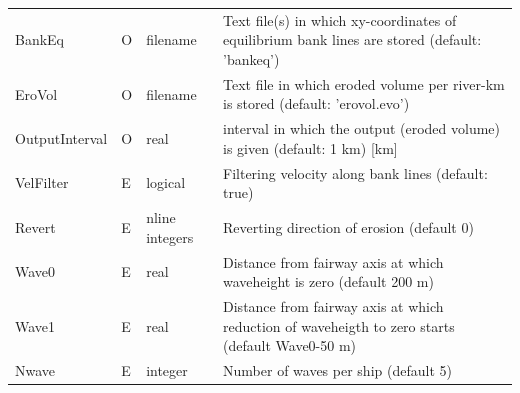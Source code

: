 \begin{tabular}{lllp{5cm}}
BankEq & O & filename & Text file(s) in which xy-coordinates of equilibrium bank lines are stored (default: 'bankeq') \\
EroVol & O & filename & Text file in which eroded volume per river-km is stored (default: 'erovol.evo') \\
OutputInterval & O & real & interval in which the output (eroded volume) is given (default: 1 km) [km] \\
VelFilter & E & logical & Filtering velocity along bank lines (default: true) \\
Revert & E & nline integers & Reverting direction of erosion (default 0) \\
Wave0 & E & real & Distance from fairway axis at which waveheight is zero (default 200 m) \\
Wave1 & E & real & Distance from fairway axis at which reduction of waveheigth to zero starts (default Wave0-50 m) \\
Nwave & E & integer & Number of waves per ship (default 5) \\ \hline
\end{tabular}

